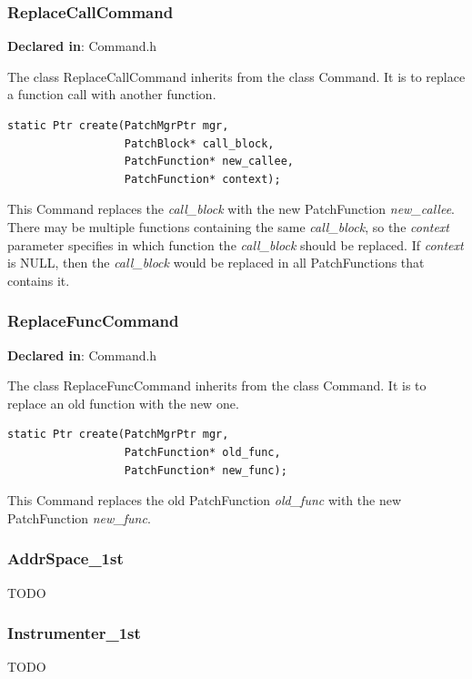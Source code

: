 \documentclass[11pt]{article}
\begin{document}
\subsubsection{ReplaceCallCommand}
\label{sec-3.3.4}

\textbf{Declared in}: Command.h

The class ReplaceCallCommand inherits from the class Command. It is to replace a
function call with another function.


\begin{verbatim}
static Ptr create(PatchMgrPtr mgr,
                  PatchBlock* call_block,
                  PatchFunction* new_callee,
                  PatchFunction* context);

\end{verbatim}



This Command replaces the \emph{call\_block} with the new PatchFunction
\emph{new\_callee}. There may be multiple functions containing the same
\emph{call\_block}, so the \emph{context} parameter specifies in which function the
\emph{call\_block} should be replaced. If \emph{context} is NULL, then the \emph{call\_block}
would be replaced in all PatchFunctions that contains it.

\subsubsection{ReplaceFuncCommand}
\label{sec-3.3.5}

\textbf{Declared in}: Command.h

The class ReplaceFuncCommand inherits from the class Command. It is to replace
an old function with the new one.


\begin{verbatim}
static Ptr create(PatchMgrPtr mgr,
                  PatchFunction* old_func,
                  PatchFunction* new_func);

\end{verbatim}



This Command replaces the old PatchFunction \emph{old\_func} with the new
PatchFunction \emph{new\_func}.

\subsubsection{AddrSpace\_1st}
\label{sec-3.3.6}


TODO

\subsubsection{Instrumenter\_1st}
\label{sec-3.3.7}


TODO
\end{document}
